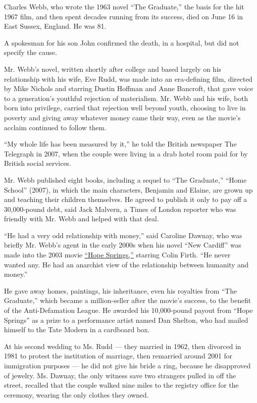 Charles Webb, who wrote the 1963 novel ``The Graduate,'' the basis for
the hit 1967 film, and then spent decades running from its success, died
on June 16 in East Sussex, England. He was 81.

A spokesman for his son John confirmed the death, in a hospital, but did
not specify the cause.

Mr. Webb's novel, written shortly after college and based largely on his
relationship with his wife, Eve Rudd, was made into an era-defining
film, directed by Mike Nichols and starring Dustin Hoffman and Anne
Bancroft, that gave voice to a generation's youthful rejection of
materialism. Mr. Webb and his wife, both born into privilege, carried
that rejection well beyond youth, choosing to live in poverty and giving
away whatever money came their way, even as the movie's acclaim
continued to follow them.

``My whole life has been measured by it,'' he told the British newspaper
The Telegraph in 2007, when the couple were living in a drab hotel room
paid for by British social services.

Mr. Webb published eight books, including a sequel to ``The Graduate,''
``Home School'' (2007), in which the main characters, Benjamin and
Elaine, are grown up and teaching their children themselves. He agreed
to publish it only to pay off a 30,000-pound debt, said Jack Malvern, a
Times of London reporter who was friendly with Mr. Webb and helped with
that deal.

``He had a very odd relationship with money,'' said Caroline Dawnay, who
was briefly Mr. Webb's agent in the early 2000s when his novel ``New
Cardiff'' was made into the 2003 movie
\href{https://www.youtube.com/watch?v=HExTPHMoxr4}{``Hope Springs,''}
starring Colin Firth. ``He never wanted any. He had an anarchist view of
the relationship between humanity and money.''

He gave away homes, paintings, his inheritance, even his royalties from
``The Graduate,'' which became a million-seller after the movie's
success, to the benefit of the Anti-Defamation League. He awarded his
10,000-pound payout from ``Hope Springs'' as a prize to a performance
artist named Dan Shelton, who had mailed himself to the Tate Modern in a
cardboard box.

At his second wedding to Ms. Rudd --- they married in 1962, then
divorced in 1981 to protest the institution of marriage, then remarried
around 2001 for immigration purposes --- he did not give his bride a
ring, because he disapproved of jewelry. Ms. Dawnay, the only witness
save two strangers pulled in off the street, recalled that the couple
walked nine miles to the registry office for the ceremony, wearing the
only clothes they owned.

